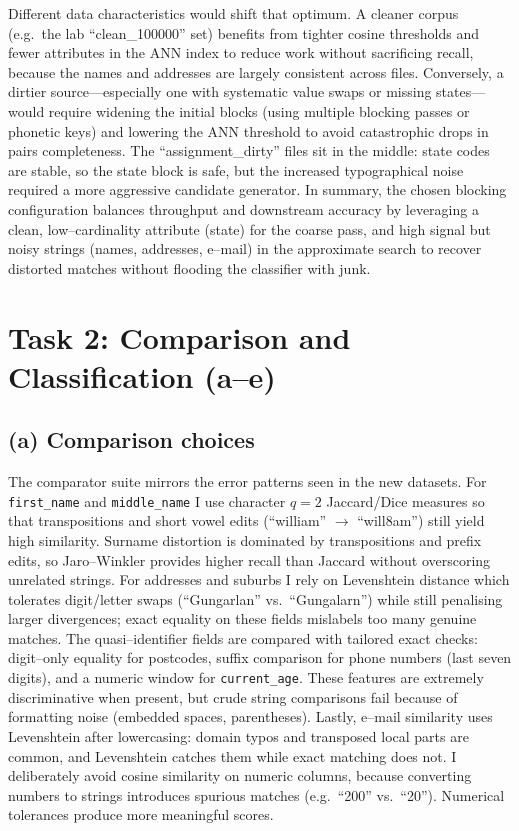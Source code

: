 \documentclass[11pt]{article}
\begin{document}
Different data characteristics would shift that optimum. A cleaner corpus (e.g.\ the lab ``clean\_100000'' set) benefits from tighter cosine thresholds and fewer attributes in the ANN index to reduce work without sacrificing recall, because the names and addresses are largely consistent across files. Conversely, a dirtier source---especially one with systematic value swaps or missing states---would require widening the initial blocks (using multiple blocking passes or phonetic keys) and lowering the ANN threshold to avoid catastrophic drops in pairs completeness. The ``assignment\_dirty'' files sit in the middle: state codes are stable, so the state block is safe, but the increased typographical noise required a more aggressive candidate generator. In summary, the chosen blocking configuration balances throughput and downstream accuracy by leveraging a clean, low--cardinality attribute (state) for the coarse pass, and high signal but noisy strings (names, addresses, e--mail) in the approximate search to recover distorted matches without flooding the classifier with junk.

\section*{Task 2: Comparison and Classification (a--e)}
\subsection*{(a) Comparison choices}
The comparator suite mirrors the error patterns seen in the new datasets. For \texttt{first\_name} and \texttt{middle\_name} I use character $q{=}2$ Jaccard/Dice measures so that transpositions and short vowel edits (``william'' $\rightarrow$ ``will8am'') still yield high similarity. Surname distortion is dominated by transpositions and prefix edits, so Jaro--Winkler provides higher recall than Jaccard without overscoring unrelated strings. For addresses and suburbs I rely on Levenshtein distance which tolerates digit/letter swaps (``Gungarlan'' vs.\ ``Gungalarn'') while still penalising larger divergences; exact equality on these fields mislabels too many genuine matches. The quasi--identifier fields are compared with tailored exact checks: digit--only equality for postcodes, suffix comparison for phone numbers (last seven digits), and a numeric window for \texttt{current\_age}. These features are extremely discriminative when present, but crude string comparisons fail because of formatting noise (embedded spaces, parentheses). Lastly, e--mail similarity uses Levenshtein after lowercasing: domain typos and transposed local parts are common, and Levenshtein catches them while exact matching does not. I deliberately avoid cosine similarity on numeric columns, because converting numbers to strings introduces spurious matches (e.g.\ ``200'' vs.\ ``20''). Numerical tolerances produce more meaningful scores.
\end{document}
